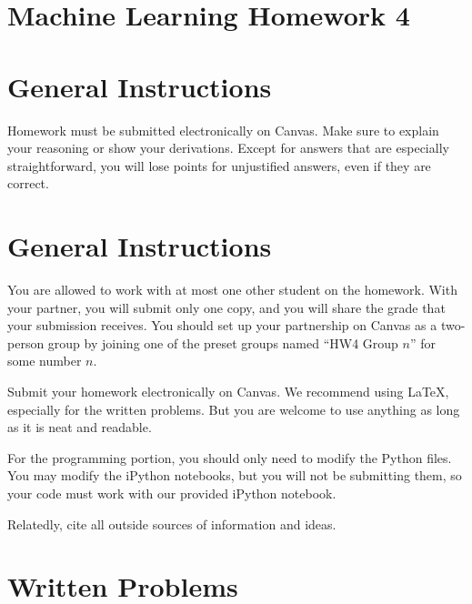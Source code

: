 \documentclass[10pt]{article}
\begin{document}
\section*{Machine Learning Homework 4}

\section*{General Instructions}

Homework must be submitted electronically on Canvas. Make sure to explain your reasoning or show your derivations. Except for answers that are especially straightforward, you will lose points for unjustified answers, even if they are correct. 

\section*{General Instructions}

You are allowed to work with at most one other student on the homework. With your partner, you will submit only one copy, and you will share the grade that your submission receives. You should set up your partnership on Canvas as a two-person group by joining one of the preset groups named ``HW4 Group $n$'' for some number $n$.

Submit your homework electronically on Canvas. We recommend using LaTeX, especially for the written problems. But you are welcome to use anything as long as it is neat and readable. 

For the programming portion, you should only need to modify the Python files. You may modify the iPython notebooks, but you will not be submitting them, so your code must work with our provided iPython notebook.

Relatedly, cite all outside sources of information and ideas. 

\section*{Written Problems}
\end{document}
